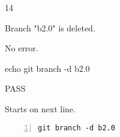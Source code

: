 \begin{description}[align=right,leftmargin=3.2cm,labelindent=3.0cm]
\item[Step:] 14
\item[Confirm:] Branch "b2.0" is deleted.
\item[Expectation:] No error.
\item[Command:] echo git  branch -d b2.0
\item[Test Result:] PASS
\item[Evidence:] Starts on next line.
\end{description}
\begin{lstlisting}[numbers=left]
git branch -d b2.0

\end{lstlisting}
